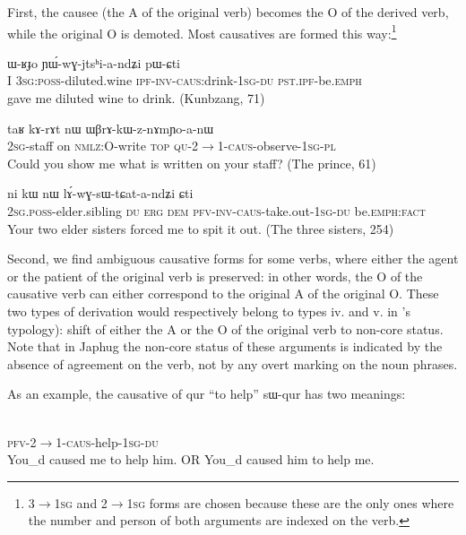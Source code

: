 \documentclass[oldfontcommands,oneside,a4paper,11pt]{article}
\newcommand{\ipa}[1]{{\phon \mbox{#1}}} %
\newcommand{\sg}{\textsc{sg}}
\newcommand{\pl}{\textsc{pl}}
\newcommand{\wav}[1]{}%
\newcommand{\pfv}{\textsc{pfv}}
\newcommand{\caus}{\textsc{caus}}
\newcommand{\dem}{\textsc{dem}}
\newcommand{\du}{\textsc{du}}
\newcommand{\erg}{\textsc{erg}}
\newcommand{\emphat}{\textsc{emph}}
\newcommand{\inv}{\textsc{inv}}
\newcommand{\ipf}{\textsc{ipf}}
\newcommand{\nmlz}{\textsc{nmlz}}
\newcommand{\fact}{\textsc{fact}}
\newcommand{\poss}{\textsc{poss}}
\newcommand{\pst}{\textsc{pst}}
\newcommand{\qu}{\textsc{qu}}
\newcommand{\topic}{\textsc{top}}
\begin{document}
First, the causee (the A of the original verb) becomes the O of the derived verb, while the original O is demoted. Most causatives are formed this way:\footnote{3$\rightarrow$\textsc{1sg} and 2$\rightarrow$\textsc{1sg} forms are chosen because these are the only ones where the number and person of both arguments are indexed on the verb.}
 \begin{exe}
\ex
\gll  \ipa{aʑo} 	\ipa{ɯ-ʁɟo} 	\ipa{ɲɯ́-wɣ-jtsʰi-a-ndʑi} 	\ipa{pɯ-ɕti}  \\
  I 3\sg{}:\poss{}-diluted.wine \ipf{}-\inv{}-\caus{}:drink-1\sg{}-\du{} \pst{}.\ipf{}-be.\emphat{} \\
   gave me diluted wine to drink. (Kunbzang, 71)
\end{exe} 
 
 \begin{exe}
\ex
\gll  \ipa{nɤ-tɤɲi} 	\ipa{taʁ} 	\ipa{kɤ-rɤt} 	\ipa{nɯ} 	\ipa{ɯβrɤ-kɯ-z-nɤmɲo-a-nɯ} \\
  2\sg{}-staff on \nmlz{}:O-write \topic{} \qu{}-2$\rightarrow$1-\textsc{caus}-observe-1\sg{}-\pl{} \\
  \glt Could you show me what is written on your staff? (The prince, 61)
\end{exe} 

 \begin{exe}
\ex
\gll \ipa{nɤ-pi} 	\ipa{ni} 	\ipa{kɯ} 	\ipa{nɯ} 	\ipa{lɤ́-wɣ-sɯ-tɕat-a-ndʑi} 	\ipa{ɕti}  \\
2\sg{}.\poss{}-elder.sibling \du{} \erg{} \dem{} \textsc{pfv}-\inv{}-\caus{}-take.out-1\sg{}-\du{} be.\emphat{}:\fact{} \\
  \glt Your two elder sisters forced me to spit it out. (The three sisters, 254)
\end{exe} 

Second, we find ambiguous causative forms for some verbs, where either the agent or the patient of the original verb is preserved: in other words, the O of the causative verb can either correspond to the original A of the original O. These two types of derivation would respectively belong to types iv. and v. in \citet[48]{dixon00causative}'s typology): shift of either the A or the O of the original verb to non-core status. Note that in Japhug the non-core status of these arguments is indicated by the absence of agreement on the verb, not by any overt marking on the noun phrases. 
 
As an example, the causative of \ipa{qur} ``to help''  \ipa{sɯ-qur} has two meanings:

\begin{exe} 
\ex \label{ex:caus:help.2>3>1}
\gll   \ipa{tɤ-kɯ-sɯ-qur-a-ndʑi}  \\
 \pfv{}-2$\rightarrow$1-\caus{}-help-1\sg{}-\du{}  \\
 \glt  You_d caused me to help him. OR You_d caused him to help me. \wav{8_tAkWsWqura}
\end{exe} 
\end{document}
